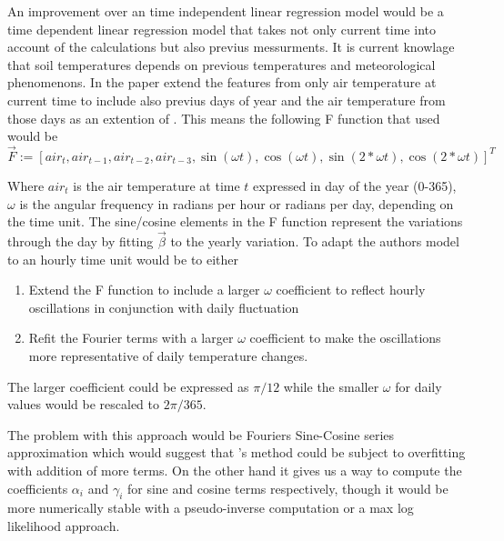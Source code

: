 An improvement over an time independent linear regression model would be a time dependent linear regression model that takes not only current time into account of the calculations but also previus messurments. It is current knowlage that soil temperatures depends on previous temperatures and meteorological phenomenons. In the paper \citeauthor{plauborg_simple_2002} \cite{plauborg_simple_2002} extend the features from only air temperature at current time to include also previus days of year and the air temperature from those days as an extention of \cite{roodenburg_estimating_1985}. This means the following F function that \citeauthor{plauborg_simple_2002} used would be 
$$
\vec{F} := [air_t , air_{t-1}, air_{t-2}, air_{t-3}, \sin(\omega t) , \cos(\omega t), \sin(2*\omega t), \cos(2*\omega t)]^T
$$

Where $air_t$ is the air temperature at time $t$ expressed in day of the year (0-365), $\omega$ is the angular frequency in radians per hour or radians per day, depending on the time unit. The sine/cosine elements in the F function represent the variations through the day by fitting $\vec{\beta}$ to the yearly variation. To adapt the authors model to an hourly time unit would be to either
\begin{enumerate}
	\item Extend the F function to include a larger $\omega$ coefficient to reflect hourly oscillations in conjunction with daily fluctuation
	\item Refit the Fourier terms with a larger $\omega$ coefficient to make the oscillations more representative of daily temperature changes.
\end{enumerate}

The larger coefficient could be expressed as $\pi/12$ while the smaller $\omega$ for daily values would be rescaled to $2\pi/365$.

The problem with this approach would be Fouriers Sine-Cosine series approximation which would suggest that \citeauthor{plauborg_simple_2002}'s method could be subject to overfitting with addition of more terms. On the other hand it gives us a way to compute the coefficients $\alpha_i$ and $\gamma_i$ for sine and cosine terms respectively, though it would be more numerically stable with a pseudo-inverse computation or a max log likelihood approach.



